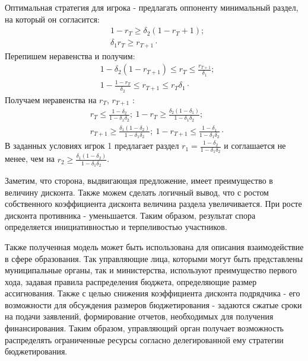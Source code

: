 Оптимальная стратегия для игрока - предлагать оппоненту минимальный раздел, на который он согласится:
\begin{equation}
	\begin{aligned}
		&1 - r_T  \ge \delta_{2}(1-r_T+1) ; \\
		&\delta_{1} r_T  \ge r_{T+1} \cdot 
	\end{aligned}
\end{equation}
Перепишем неравенства и получим:
\begin{equation}
	\begin{aligned}
		&1-\delta_{2}(1-r_{T+1}) \le r_T \le \frac{r_{T+1}}{\delta_1};\\
		&1-\frac{1-r_T}{\delta_{2}} \le r_{T+1} \le r_T\delta_{1} \cdot
	\end{aligned}
\end{equation}
Получаем неравенства на $r_T$, $r_{T+1}$ :
\begin{equation}
	\begin{aligned}
		&r_T \le \frac{1-\delta_{2}}{1-\delta_{1}\delta_{2}}; \ 1 -r_T \ge \frac{\delta_{2}(1-\delta_{1})}{1-\delta_{1}\delta_{2}}; \\
		&r_{T+1} \ge  \frac{\delta_{1}(1-\delta_{2})}{1-\delta_{1}\delta_{2}};\ 1 -r_{T+1} \le \frac{1-\delta_{1}}{1-\delta_{1}\delta_{2}} \cdot
	\end{aligned}
\end{equation}
В заданных условиях игрок 1 предлагает раздел $r_1= \frac{1-\delta_{2}}{1-\delta_{1}\delta_{2}}$  и соглашается не менее, чем на $r_2 \ge \frac{\delta_{1}(1-\delta_{2})}{1-\delta_{1}\delta_{2}}$.

Заметим, что сторона, выдвигающая предложение, имеет преимущество в величину дисконта. Также можем сделать логичный вывод, что с ростом собственного коэффициента дисконта величина раздела увеличивается. При росте дисконта противника - уменьшается. Таким образом, результат спора определяется инициативностью и терпеливостью участников.

Также полученная модель может быть использована для описания взаимодействие в сфере образования. Так управляющие лица, которыми могут быть представлены муниципальные органы, так и министерства, используют преимущество первого хода, задавая правила распределения бюджета, определяющие размер ассигнования. Также с целью снижения коэффициента дисконта подрядчика - его возможности для обсуждения размеров бюджетирования - задаются сжатые сроки на подачи заявлений, формирование отчетов, необходимых для получения финансирования. Таким образом, управляющий орган получает возможность распределять ограниченные ресурсы согласно делегированной ему стратегии бюджетирования.  


